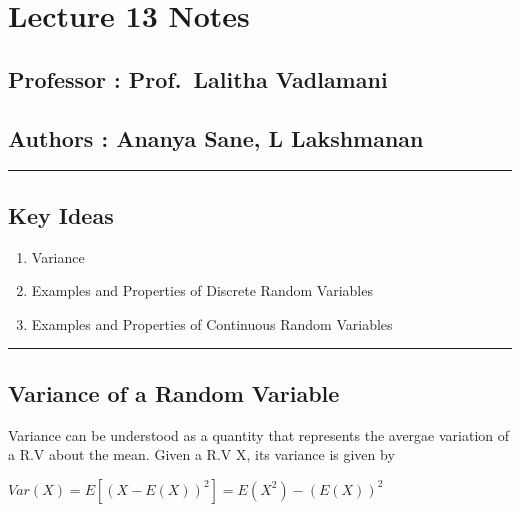 \hypertarget{lecture-13-notes}{%
\section{Lecture 13 Notes}\label{lecture-13-notes}}

\hypertarget{professor-prof.-lalitha-vadlamani}{%
\subsection{Professor : Prof.~Lalitha
Vadlamani}\label{professor-prof.-lalitha-vadlamani}}

\hypertarget{authors-ananya-sane-l-lakshmanan}{%
\subsection{Authors : Ananya Sane, L
Lakshmanan}\label{authors-ananya-sane-l-lakshmanan}}

\begin{center}\rule{0.5\linewidth}{0.5pt}\end{center}

\hypertarget{key-ideas}{%
\subsection{Key Ideas}\label{key-ideas}}

\begin{enumerate}
\def\labelenumi{\arabic{enumi}.}
\tightlist
\item
  Variance
\item
  Examples and Properties of Discrete Random Variables
\item
  Examples and Properties of Continuous Random Variables
\end{enumerate}

\begin{center}\rule{0.5\linewidth}{0.5pt}\end{center}

\hypertarget{variance-of-a-random-variable}{%
\subsection{Variance of a Random
Variable}\label{variance-of-a-random-variable}}

Variance can be understood as a quantity that represents the avergae
variation of a R.V about the mean. Given a R.V X, its variance is given
by

\(Var(X) = E[(X - E(X))^2] = E(X^2) - (E(X))^2\)

